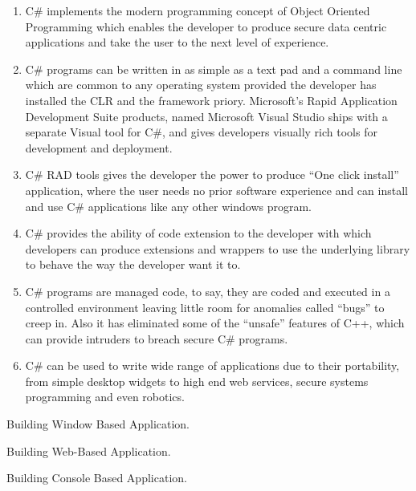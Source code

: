 \documentclass{article} %
\begin{document}
\noindent 

\noindent 

\begin{enumerate}
\item  C\# implements the modern programming concept of Object Oriented Programming which enables the developer to produce secure data centric applications and take the user to the next level of experience. 

\item  C\# programs can be written in as simple as a text pad and a command line which are common to any operating system provided the developer has installed the CLR and the framework priory. Microsoft's Rapid Application Development Suite products, named Microsoft Visual Studio ships with a separate Visual tool for C\#, and gives developers visually rich tools for development and deployment. 

\item  C\# RAD tools gives the developer the power to produce ``One click install'' application, where the user needs no prior software experience and can install and use C\# applications like any other windows program. 

\item  C\# provides the ability of code extension to the developer with which developers can produce extensions and wrappers to use the underlying library to behave the way the developer want it to. 

\item  C\# programs are managed code, to say, they are coded and executed in a controlled environment leaving little room for anomalies called ``bugs'' to creep in. Also it has eliminated some of the ``unsafe'' features of C++, which can provide intruders to breach secure C\# programs. 

\item  C\# can be used to write wide range of applications due to their portability, from simple desktop widgets to high end web services, secure systems programming and even robotics. 
\end{enumerate}

\noindent 

\noindent \textbf{}\underbar{}

\noindent 

 Building Window Based Application. 

 Building Web-Based Application. 

 Building Console Based Application. 
\end{document}
